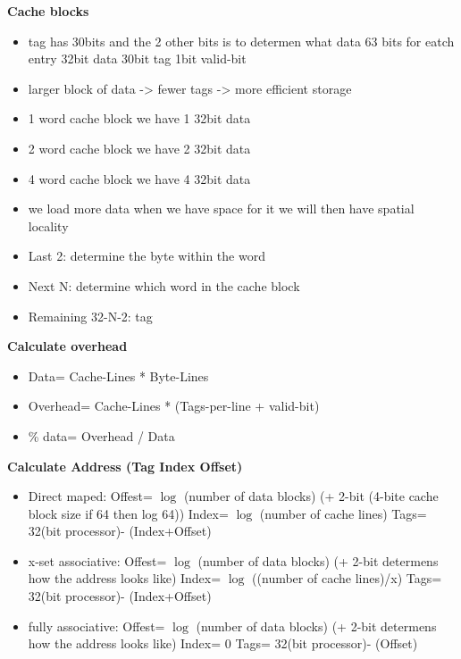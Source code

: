 \textbf{Cache blocks}
\begin{itemize}
\item tag has 30bits and the 2 other bits is to determen what data
  63 bits for eatch entry 32bit data 30bit tag 1bit valid-bit 
\item larger block of data -> fewer tags -> more efficient storage
\item 1 word cache block we have 1 32bit data
\item 2 word cache block we have 2 32bit data 
\item 4 word cache block we have 4 32bit data
\item we load more data when we have space for it
  we will then have spatial locality
\item Last 2: determine the byte within the word   
\item Next N: determine which word in the cache block 
\item Remaining 32-N-2: tag
\end{itemize}

\textbf{Calculate overhead}
\begin{itemize}
\item  Data= Cache-Lines * Byte-Lines
\item  Overhead= Cache-Lines * (Tags-per-line + valid-bit)
\item  \% data=  Overhead / Data
\end{itemize}

\textbf{Calculate Address (Tag Index Offset)} %
\begin{itemize}
\item  Direct maped: \newline
  Offest= $\log$ (number of data blocks)  (+ 2-bit (4-bite cache block size if 64 then log 64)) \newline
  Index= $\log$ (number of cache lines) \newline
  Tags= 32(bit processor)- (Index+Offset) 
\item  x-set associative: \newline
  Offest= $\log$ (number of data blocks)  (+ 2-bit determens how the address looks like) \newline
  Index= $\log$ ((number of cache lines)/x) \newline
  Tags= 32(bit processor)- (Index+Offset)
\item  fully associative: \newline
  Offest= $\log$ (number of data blocks)  (+ 2-bit determens how the address looks like) \newline
  Index= 0 \newline
  Tags= 32(bit processor)- (Offset)
\end{itemize}

